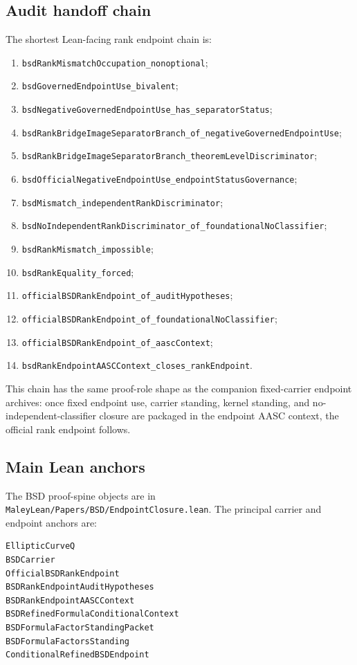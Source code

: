 \documentclass[11pt]{article}
\begin{document}
\subsection{Audit handoff chain}
The shortest Lean-facing rank endpoint chain is:
\begin{enumerate}
\item \texttt{bsdRankMismatchOccupation\_nonoptional};
\item \texttt{bsdGovernedEndpointUse\_bivalent};
\item \texttt{bsdNegativeGovernedEndpointUse\_has\_separatorStatus};
\item \texttt{bsdRankBridgeImageSeparatorBranch\_of\_negativeGovernedEndpointUse};
\item \texttt{bsdRankBridgeImageSeparatorBranch\_theoremLevelDiscriminator};
\item \texttt{bsdOfficialNegativeEndpointUse\_endpointStatusGovernance};
\item \texttt{bsdMismatch\_independentRankDiscriminator};
\item \texttt{bsdNoIndependentRankDiscriminator\_of\_foundationalNoClassifier};
\item \texttt{bsdRankMismatch\_impossible};
\item \texttt{bsdRankEquality\_forced};
\item \texttt{officialBSDRankEndpoint\_of\_auditHypotheses};
\item \texttt{officialBSDRankEndpoint\_of\_foundationalNoClassifier};
\item \texttt{officialBSDRankEndpoint\_of\_aascContext};
\item \texttt{bsdRankEndpointAASCContext\_closes\_rankEndpoint}.
\end{enumerate}
This chain has the same proof-role shape as the companion fixed-carrier endpoint archives: once fixed endpoint use, carrier standing, kernel standing, and no-independent-classifier closure are packaged in the endpoint AASC context, the official rank endpoint follows.

\subsection{Main Lean anchors}
The BSD proof-spine objects are in \texttt{MaleyLean/Papers/BSD/EndpointClosure.lean}. The principal carrier and endpoint anchors are:
\begin{verbatim}
EllipticCurveQ
BSDCarrier
OfficialBSDRankEndpoint
BSDRankEndpointAuditHypotheses
BSDRankEndpointAASCContext
BSDRefinedFormulaConditionalContext
BSDFormulaFactorStandingPacket
BSDFormulaFactorsStanding
ConditionalRefinedBSDEndpoint
\end{verbatim}
\end{document}
